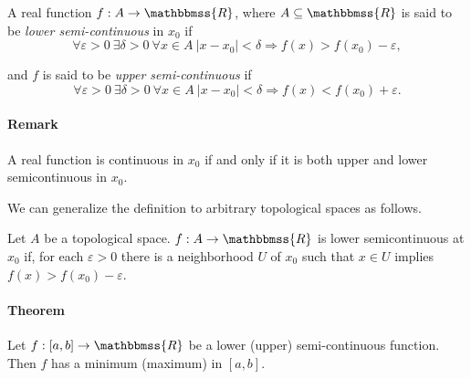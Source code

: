 \documentclass[12pt]{article}
\newcommand{\R}{\mathbbmss{R}}
\newcommand{\mathbb}[1]{\mathbbmss{#1}}
\begin{document}
A real function $f: A \rightarrow \R$, where $A\subseteq \R$ is said to be \emph{lower semi-continuous} in $x_0$ if
\[ \forall \varepsilon > 0\ \exists \delta > 0\ \forall x \in A\ |x-x_0| < \delta \Rightarrow f(x) > f(x_0) - \varepsilon, \]

and $f$ is said to be \emph{upper semi-continuous} if
\[ \forall \varepsilon > 0\ \exists \delta > 0\ \forall x \in A\ |x-x_0| < \delta \Rightarrow f(x) < f(x_0) + \varepsilon. \]

\paragraph{Remark}
A real function is continuous in $x_0$ if and only if it is both upper and lower semicontinuous in $x_0$.

We can generalize the definition to arbitrary topological spaces as follows.

Let $A$ be a topological space.
$f:A\to\R$ is lower semicontinuous at $x_0$ if, for each $\varepsilon>0$ there is a neighborhood $U$ of $x_0$ such that $x\in U$ implies $f(x)>f(x_0)-\varepsilon$.

\paragraph{Theorem}
Let $f: [a,b] \rightarrow \mathbb{R}$ be a lower (upper) semi-continuous function. Then $f$ has a minimum (maximum) in $[a,b]$.
\end{document}
